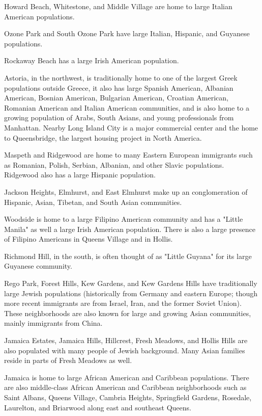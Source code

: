 Howard Beach, Whitestone, and Middle Village are home to large Italian
American populations.

Ozone Park and South Ozone Park have large Italian, Hispanic, and
Guyanese populations.

Rockaway Beach has a large Irish American population.

Astoria, in the northwest, is traditionally home to one of the largest
Greek populations outside Greece, it also has large Spanish American,
Albanian American, Bosnian American, Bulgarian American, Croatian
American, Romanian American and Italian American communities, and is
also home to a growing population of Arabs, South Asians, and young
professionals from Manhattan. Nearby Long Island City is a major
commercial center and the home to Queensbridge, the largest housing
project in North America.

Maspeth and Ridgewood are home to many Eastern European immigrants such
as Romanian, Polish, Serbian, Albanian, and other Slavic populations.
Ridgewood also has a large Hispanic population.

Jackson Heights, Elmhurst, and East Elmhurst make up an conglomeration
of Hispanic, Asian, Tibetan, and South Asian communities.

Woodside is home to a large Filipino American community and has a
"Little Manila" as well a large Irish American population. There is also
a large presence of Filipino Americans in Queens Village and in Hollis.

Richmond Hill, in the south, is often thought of as "Little Guyana" for
its large Guyanese community.

Rego Park, Forest Hills, Kew Gardens, and Kew Gardens Hills have
traditionally large Jewish populations (historically from Germany and
eastern Europe; though more recent immigrants are from Israel, Iran, and
the former Soviet Union). These neighborhoods are also known for large
and growing Asian communities, mainly immigrants from China.

Jamaica Estates, Jamaica Hills, Hillcrest, Fresh Meadows, and Hollis
Hills are also populated with many people of Jewish background. Many
Asian families reside in parts of Fresh Meadows as well.

Jamaica is home to large African American and Caribbean populations.
There are also middle-class African American and Caribbean neighborhoods
such as Saint Albans, Queens Village, Cambria Heights, Springfield
Gardens, Rosedale, Laurelton, and Briarwood along east and southeast
Queens.

